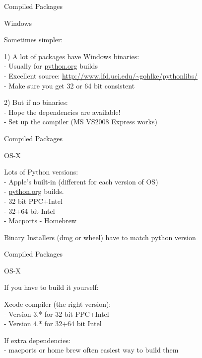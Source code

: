 \documentclass{beamer}
\begin{document}
\begin{frame}[fragile]{Compiled Packages}

{\LARGE Windows}

\vfill
{\Large Sometimes simpler:}

\vfill
{\Large 1) A lot of packages have Windows binaries:\\[0.1in]
            - Usually for \url{python.org} builds \\[0.1in]
            - Excellent source:} \url{http://www.lfd.uci.edu/~gohlke/pythonlibs/} \\[0.1in]
{\Large            - Make sure you get 32 or 64 bit consistent
}

\vfill
{\Large 2) But if no binaries: \\[0.1in]
           - Hope the dependencies are available!\\[0.1in]
           - Set up the compiler (MS VS2008 Express works)
}

\end{frame} 

\begin{frame}[fragile]{Compiled Packages}

{\LARGE OS-X}

\vfill
{\Large Lots of Python versions:\\[0.1in]
  - Apple's built-in (different for each version of OS)\\[0.1in]
  - \url{python.org} builds.\\
  \hspace{0.5in}- 32 bit PPC+Intel\\
  \hspace{0.5in}- 32+64 bit Intel\\[0.1in]
  - Macports
  - Homebrew
}


\vfill
{\Large Binary Installers (dmg or wheel) have to match python version}

\end{frame} 

\begin{frame}[fragile]{Compiled Packages}

{\LARGE OS-X}

\vfill
{\Large If you have to build it yourself:}

\vfill
{\Large Xcode compiler (the right version):\\[0.1in]
  - Version 3.* for 32 bit PPC+Intel\\[0.1in]
  - Version 4.* for 32+64 bit Intel\\
}

\vfill
{\Large If extra dependencies:\\[0.1in]
  - macports or home brew often easiest way to build them
}

\end{frame} 
\end{document}
